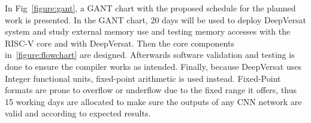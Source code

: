 In Fig~\ref{figure:gant}, a GANT chart with the proposed schedule for the
planned work is presented. In the GANT chart, 20 days will be used to deploy DeepVersat system and study external memory use and testing
memory accesses with the RISC-V core and with DeepVersat. Then the core components in~\ref{figure:flowchart} are designed. Afterwards
software validation and testing is done to ensure the compiler works as intended. Finally, because DeepVersat uses Integer functional units, fixed-point arithmetic
is used instead. Fixed-Point formats are prone to overflow or underflow due to the fixed range it offers, thus 15 working days are allocated to
make sure the outputs of any CNN network are valid and according to expected results. 






